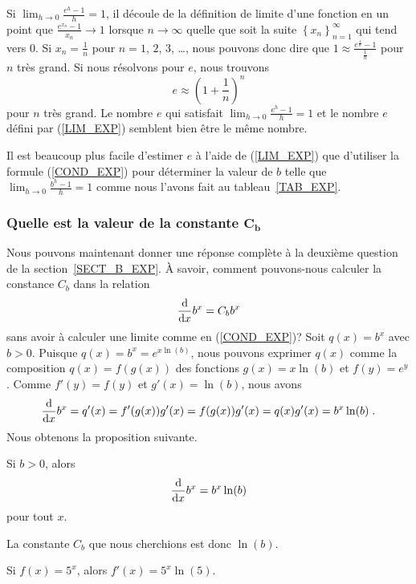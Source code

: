 {\begin{rmk}
Si $\displaystyle \lim_{h\rightarrow 0} \frac{e^h-1}{h} = 1$, il
découle de la définition de limite d'une fonction en un point que
$\displaystyle \frac{e^{x_n}-1}{x_n} \rightarrow 1$ lorsque
$n \rightarrow \infty$ quelle que soit la suite
$\displaystyle \left\{x_n\right\}_{n=1}^\infty$ qui tend vers $0$.  Si
$x_n = \frac{1}{n}$ pour $n=1$, $2$, $3$, \ldots, nous pouvons donc dire que
$\displaystyle 1 \approx \frac{e^{\frac{1}{n}}-1}{\frac{1}{n}}$
pour $n$ très grand.  Si nous résolvons pour $e$, nous trouvons
\[
e \approx \left(1 + \frac{1}{n}\right)^n
\]
pour $n$ très grand.  Le nombre $e$ qui satisfait
$\displaystyle \lim_{h\rightarrow 0} \frac{e^h-1}{h} = 1$ et le nombre
$e$ défini par (\ref{LIM_EXP}) semblent bien être le même nombre.

Il est beaucoup plus facile d'estimer $e$ à l'aide de (\ref{LIM_EXP})
que d'utiliser la formule (\ref{COND_EXP}) pour déterminer la valeur
de $b$ telle que $\displaystyle \lim_{h\rightarrow 0} \frac{b^h-1}{h} = 1$
comme nous l'avons fait au tableau~\ref{TAB_EXP}.
\end{rmk}

\subsubsection{Quelle est la valeur de la constante $\mathbf{C_b}$}

Nous pouvons maintenant donner une réponse complète à la deuxième question
de la section~\ref{SECT_B_EXP}.  À savoir, comment pouvons-nous calculer la
constance $C_b$ dans la relation
\[
\dfdx{b^x}{x} = C_b b^x
\]
sans avoir à calculer une limite comme en (\ref{COND_EXP})?  Soit
$q(x) = b^x$ avec $b>0$.  Puisque
$\displaystyle q(x) = b^x = e^{x\ln(b)}$, 
nous pouvons exprimer $q(x)$ comme la composition $q(x) = f(g(x))$ des
fonctions $g(x) = x \ln(b)$ et $f(y) = e^y$. Comme
$f'(y) = f(y)$ et $g'(x) = \ln(b)$, nous avons
\[
\dfdx{b^x}{x} = q'(x) = f'(g(x)) g'(x) = f(g(x)) g'(x)
= q(x) g'(x) = b^x \ln(b) \;.
\]
Nous obtenons la proposition suivante.

\begin{prop}\label{BexpX}
Si $b>0$, alors
\[
\dfdx{b^x}{x} = b^x \ln(b)
\]
pour tout $x$.
\end{prop}

La constante $C_b$ que nous cherchions est donc $\ln(b)$.

\begin{egg}
Si $f(x) = 5^x$, alors $f'(x) = 5^x \ln(5)$.
\end{egg}

}
